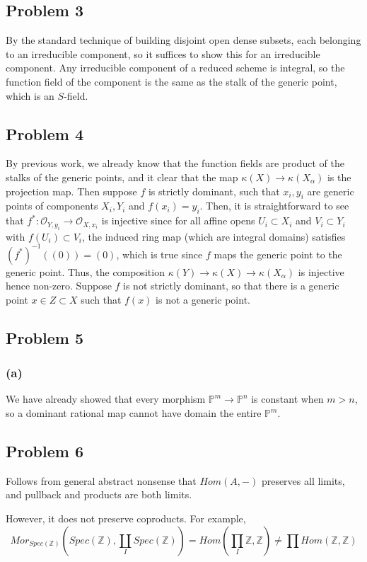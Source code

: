\documentclass{article}
\theoremstyle{definition}
\theoremstyle{definition}
\theoremstyle{definition}
\theoremstyle{definition}
\theoremstyle{definition}
\theoremstyle{definition}
\theoremstyle{definition}
\begin{document}
\subsection*{Problem 3}
By the standard technique of building disjoint open dense subsets, each belonging to an irreducible component, so it suffices to show this for an irreducible component. Any irreducible component of a reduced scheme is integral, so the function field of the component is the same as the stalk of the generic point, which is an $S$-field. 


\subsection*{Problem 4}
By previous work, we already know that the function fields are product of the stalks of the generic points, and it clear that the map $\kappa(X)\to \kappa(X_{\alpha})$ is the projection map. Then suppose $f$ is strictly dominant, such that $x_i,y_i$ are generic points of components $X_i,Y_i$ and $f(x_i)=y_i$. Then, it is straightforward to see that $f^*: \mathcal{O}_{Y,y_i}\to \mathcal{O}_{X,x_i}$ is injective since for all affine opens $U_i\subset X_i$ and $V_i\subset Y_i$ with $f(U_i)\subset V_i$, the induced ring map (which are integral domains) satisfies $(f^*)^{-1}((0))=(0)$, which is true since $f$ maps the generic point to the generic point. Thus, the composition $\kappa(Y)\to \kappa(X)\to \kappa(X_{\alpha})$ is injective hence non-zero. Suppose $f$ is not strictly dominant, so that there is a generic point $x\in Z\subset X$ such that $f(x)$ is not a generic point. 


\subsection*{Problem 5}
\subsubsection*{(a)}
We have already showed that every morphism $\mathbb{P}^m\to \mathbb{P}^n$ is constant when $m>n$, so a dominant rational map cannot have domain the entire $\mathbb{P}^m$.

\subsection*{Problem 6}
Follows from general abstract nonsense that $Hom(A,-)$ preserves all limits, and pullback and products are both limits. 

However, it does not preserve coproducts. For example, 
\[Mor_{Spec(\mathbb{Z})}(Spec(\mathbb{Z}), \coprod_{I}Spec(\mathbb{Z}) )=Hom(\prod_I \mathbb{Z}, \mathbb{Z})\neq \prod Hom(\mathbb{Z},\mathbb{Z})\]
\end{document}
